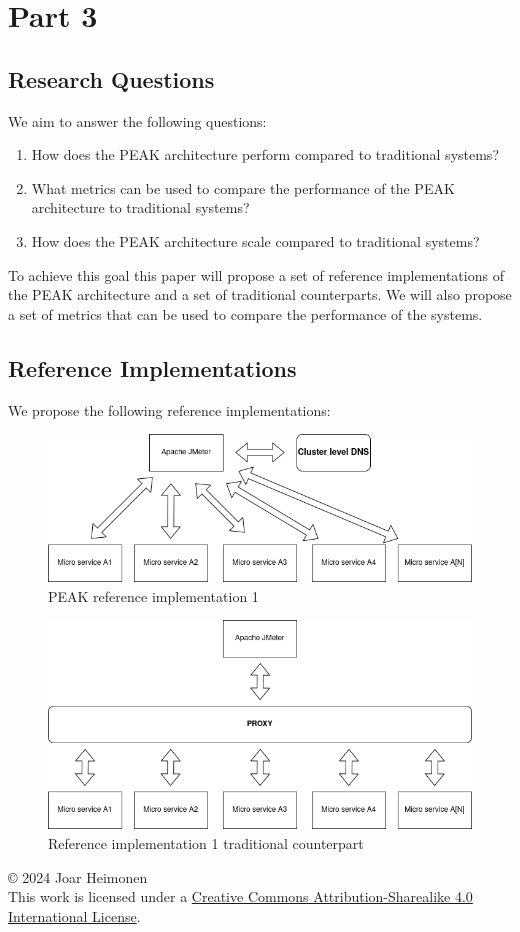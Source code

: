 \documentclass[12pt]{article}
\newcommand{\license}{
    \vspace{1em}
    \noindent\small{© 2024 Joar Heimonen\\
    This work is licensed under a \href{https://creativecommons.org/licenses/by-sa/4.0/}{Creative Commons Attribution-Sharealike 4.0 International License}.}
    \vspace{1em}
}
\begin{document}
\section{Part 3}
\subsection{Research Questions}
We aim to answer the following questions:
\begin{enumerate}
    \item How does the PEAK architecture perform compared to traditional systems?
    \item What metrics can be used to compare the performance of the PEAK architecture to traditional systems?
    \item How does the PEAK architecture scale compared to traditional systems?
\end{enumerate}
To achieve this goal this paper will propose a set of reference implementations of the PEAK architecture and a set of traditional counterparts.
We will also propose a set of metrics that can be used to compare the performance of the systems.

\subsection{Reference Implementations}
We propose the following reference implementations:

\begin{figure}[H]
    \centering
    \includegraphics[width=\textwidth]{test-one.drawio.png}
    \caption{PEAK reference implementation 1}
\end{figure}

\begin{figure}[H]
    \centering
    \includegraphics[width=\textwidth]{test-one-traditional.drawio.png}
    \caption{Reference implementation 1 traditional counterpart}
\end{figure}




\printbibliography
\license
\end{document}
